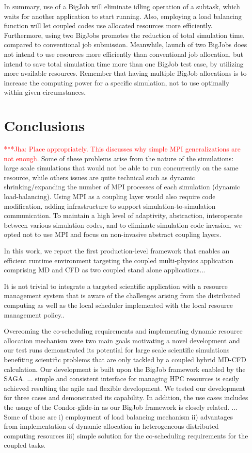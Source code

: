 \documentclass[conference,final]{IEEEtran}
\newcommand{\jhanote}[1]{ {\textcolor{red} { ***Jha: #1 }}}
\newcommand{\jhanote}[1]{}
\begin{document}
In summary, use of a BigJob will eliminate idling operation of a
subtask, which waits for another application to start running. Also,
employing a load balancing function will let coupled codes use
allocated resources more efficiently. Furthermore, using two BigJobs
promotes the reduction of total simulation time, compared to
conventional job submission. Meanwhile, launch of two BigJobs does not
intend to use resources more efficiently than conventional job
allocation, but intend to save total simulation time more than one
BigJob test case, by utilizing more available resources. Remember that
having multiple BigJob allocations is to increase the computing power
for a specific simulation, not to use optimally within given
circumstances.

\section{Conclusions}

\jhanote{Place appropriately. This discusses why simple MPI
  generalizations are not enough.} Some of these problems arise from
the nature of the simulations: large scale simulations that would not
be able to run concurrently on the same resource, while others issues
are quite technical such as dynamic shrinking/expanding the number of
MPI processes of each simulation (dynamic load-balancing). Using MPI
as a coupling layer would also require code modification, adding
infrastructure to support simulation-to-simulation communication. To
maintain a high level of adaptivity, abstraction, interoperate between
various simulation codes, and to eliminate simulation code invasion,
we opted not to use MPI and focus on non-invasive abstract coupling
layers.

In this work, we report the first production-level framework that
enables an efficient runtime environment targeting the coupled
multi-physics application comprising MD and CFD as two coupled stand
alone applications...

It is not trivial to integrate a targeted scientific application with
a resource management system that is aware of the challenges arising
from the distributed computing as well as the local scheduler
implemented with the local resource management policy..

Overcoming the co-scheduling requirements and implementing dynamic
resource allocation mechanism were two main goals motivating a novel
development and our test runs demonstrated its potential for large
scale scientific simulations benefiting scientific problems that are
only tackled by a coupled hybrid MD-CFD calculation.  Our development
is built upon the BigJob framework enabled by the SAGA. ... simple and
consistent interface for managing HPC resources is easily achieved
resulting the agile and flexible development. We tested our
development for three cases and demonstrated its capability. In
addition, the use cases includes the usage of the Condor-glide-in as
our BigJob framework is closely related. ... Some of those are i)
employment of load balancing mechanism ii) advantages from
implementation of dynamic allocation in heterogeneous distributed
computing resources iii) simple solution for the co-scheduling
requirements for the coupled tasks.
\end{document}
